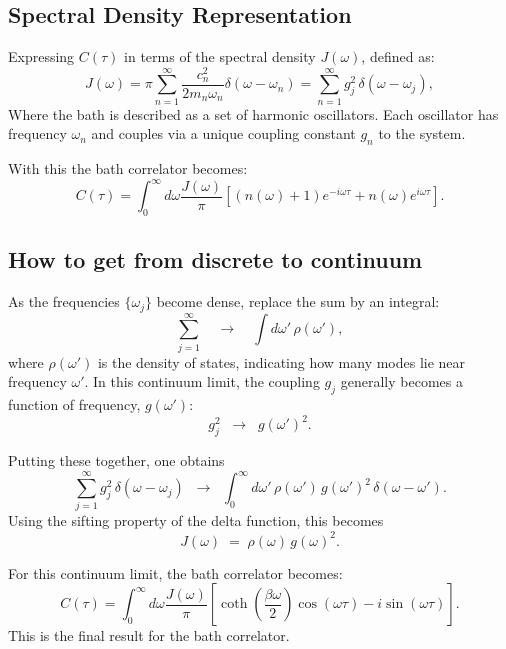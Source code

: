 \subsection{Spectral Density Representation}
\label{subsec:spectral_density}

Expressing \( C(\tau) \) in terms of the spectral density \( J(\omega) \), defined as:
\begin{equation} \label{eq:spectral_density}
J(\omega) = \pi \sum_{n=1}^{\infty} \frac{c_n^2}{2 m_n \omega_n} \delta(\omega - \omega_n) =  \sum_{n=1}^{\infty} g_j^2\,\delta(\omega - \omega_j),
\end{equation}
Where the bath is described as a set of harmonic oscillators.
Each oscillator has frequency $\omega_n$ and couples via a unique coupling constant $g_n$ to the system.

With this the bath correlator becomes:
\begin{equation} \label{eq:correlator_spectral_density}
C(\tau) = \int_0^\infty d\omega \frac{J(\omega)}{\pi} \left[ (n(\omega) + 1) e^{-i \omega \tau} + n(\omega) e^{i \omega \tau} \right].
\end{equation}


\subsection{How to get from discrete to continuum}
As the frequencies $\{\omega_j\}$ become dense, replace the sum by an integral:
\[
\sum_{j=1}^{\infty} \quad \longrightarrow \quad \int d\omega'\,\rho(\omega'),
\]
where $\rho(\omega')$ is the density of states, indicating how many modes lie near frequency $\omega'$.
In this continuum limit, the coupling $g_j$ generally becomes a function of frequency, $g(\omega')$:
\[
g_j^2 \;\;\longrightarrow\;\; g(\omega')^2.
\]

Putting these together, one obtains
\[
\sum_{j=1}^{\infty} g_j^2\,\delta(\omega - \omega_j)
\;\;\longrightarrow\;\;
\int_{0}^{\infty} d\omega'\,\rho(\omega')\,g(\omega')^2\,\delta(\omega - \omega').
\]
Using the sifting property of the delta function, this becomes
\[
J(\omega) \;=\; \rho(\omega)\,g(\omega)^2.
\]

For this continuum limit, the bath correlator becomes:
\begin{equation} \label{eq:correlator_final}
C(\tau) = \int_0^\infty d\omega \frac{J(\omega)}{\pi} \left[ \coth\left( \frac{\beta \omega}{2} \right) \cos(\omega \tau) - i \sin(\omega \tau) \right].
\end{equation}
This is the final result for the bath correlator.

